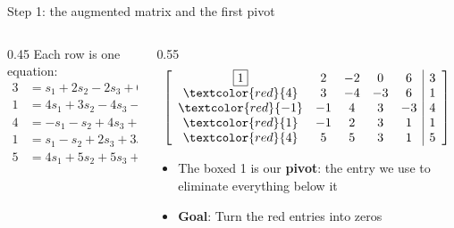 \ifdefined\PRESENTATION\else\PassOptionsToClass{handout}{beamer}\fi\documentclass[aspectratio=169, lualatex]{beamer}
\begin{document}
\begin{frame}{Step 1: the augmented matrix and the first pivot}
	\begin{columns}[c]
		\begin{column}{0.45\textwidth}
			Each row is one equation:
			\begin{align*}
				3 & = s_1 + 2s_2 - 2s_3 + 6s_5         \\
				1 & = 4s_1 + 3s_2 - 4s_3 - 3s_4 + 6s_5 \\
				4 & = -s_1 - s_2 + 4s_3 + 3s_4 - 3s_5  \\
				1 & = s_1 - s_2 + 2s_3 + 3s_4 + s_5    \\
				5 & = 4s_1 + 5s_2 + 5s_3 + 3s_4 + s_5
			\end{align*}
		\end{column}
		\begin{column}{0.55\textwidth}
			\[
				\left[\begin{array}{ccccc|c}
						\boxed{1}           & 2  & -2 & 0  & 6  & 3 \\
						\textcolor{red}{4}  & 3  & -4 & -3 & 6  & 1 \\
						\textcolor{red}{-1} & -1 & 4  & 3  & -3 & 4 \\
						\textcolor{red}{1}  & -1 & 2  & 3  & 1  & 1 \\
						\textcolor{red}{4}  & 5  & 5  & 3  & 1  & 5
					\end{array}\right]
			\]
			\begin{itemize}
				\item The boxed 1 is our \textbf{pivot}: the entry we use to eliminate everything below it
				\item \textbf{Goal}: Turn the red entries into zeros
			\end{itemize}
		\end{column}
	\end{columns}
\end{frame}
\end{document}
